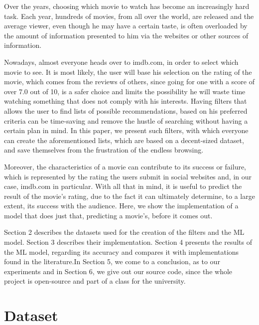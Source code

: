 \documentclass[letterpaper,twocolumn,10pt]{article}
\begin{document}
\par Over the years, choosing which movie to watch has become an increasingly hard task. Each year, hundreds of movies, from all over the world, are released and the average viewer, even though he may have a certain taste, is often overloaded by the amount of information presented to him via the websites or other sources of information. 
\par Nowadays, almost everyone heads over to imdb.com, in order to select which movie to see. It is most likely, the user will base his selection on the rating of the movie, which comes from the reviews of others, since going for one with a score of over 7.0 out of 10, is a safer choice and limits the possibility he will waste time watching something that does not comply with his interests. Having filters that allows the user to find lists of possible recommendations, based on his preferred criteria can be time-saving and remove the hustle of searching without having a certain plan in mind. In this paper, we present such filters, with which everyone can create the aforementioned lists, which are based on a decent-sized dataset, and save themselves from the frustration of the endless browsing.
\par Moreover, the characteristics of a movie can contribute to its success or failure, which is represented by the rating the users submit in social websites and, in our case, imdb.com in particular. With all that in mind, it is useful to predict the result of the movie’s rating, due to the fact it can ultimately determine, to a large extent, its success with the audience. Here, we show the implementation of a model that does just that, predicting a movie's, before it comes out.
\par Section 2 describes the datasets used for the creation of the filters and the ML model. Section 3 describes their implementation. Section 4 presents the results of the ML model, regarding its accuracy and compares it with implementations found in the literature.In Section 5, we come to a conclusion, as to our experiments and in Section 6, we give out our source code, since the whole project is open-source and part of a class for the university.
\section{Dataset}
\end{document}

